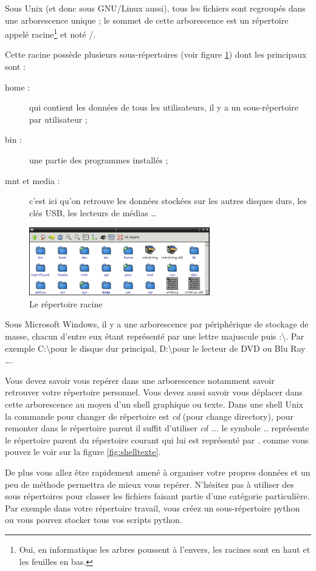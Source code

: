 Sous Unix (et donc sous GNU/Linux aussi), tous les fichiers sont regroupés dans une arborescence unique ; le sommet de cette arborescence est un répertoire appelé racine\footnote{Oui, en informatique les arbres poussent à l'envers, les racines sont en haut et les feuilles en bas.} et noté /.\par
Cette racine possède plusieurs sous-répertoires (voir figure \ref{fig:rox2}) dont les principaux sont :
\begin{description}
\item[home :] qui contient les données de tous les utilisateurs, il y a un sous-répertoire par utilisateur ;
\item[bin :] une partie des programmes installés ;
\item[mnt et media :] c'est ici qu'on retrouve les données stockées sur les autres disques durs, les clés USB, les lecteurs de médias \dots
\end{description}
\begin{figure}[ht]
  \centering
  \includegraphics[width=0.7\textwidth]{rox2}
  \caption{\footnotesize{Le répertoire racine}}
  \label{fig:rox2}
\end{figure}
Sous Microsoft Windows, il y a une arborescence par périphérique de stockage de masse, chacun d'entre eux étant représenté par une lettre majuscule puis :\textbackslash. Par exemple C:\textbackslash pour le disque dur principal, D:\textbackslash pour le lecteur de DVD ou Blu Ray \dots. \par
Vous devez savoir vous repérer dans une arborescence notamment savoir retrouver votre répertoire personnel. Vous devez aussi savoir vous déplacer dans cette arborescence au moyen d'un shell graphique ou texte. Dans une shell Unix la commande pour changer de répertoire est \emph{cd} (pour change directory), pour remonter dans le répertoire parent il suffit d'utiliser \emph{cd ..}. le symbole \emph{..} représente le répertoire parent du répertoire courant qui lui est représenté par \emph{.} comme vous pouvez le voir sur la figure \ref{fig:shelltexte}.\par
De plus vous allez être rapidement amené à organiser votre propres données et un peu de méthode permettra de mieux vous repérer. N'hésitez pas à utiliser des sous répertoires pour classer les fichiers faisant partie d'une catégorie particulière. Par exemple dans votre répertoire travail, vous créez un sous-répertoire python ou vous pouvez stocker tous vos scripts python.\par
